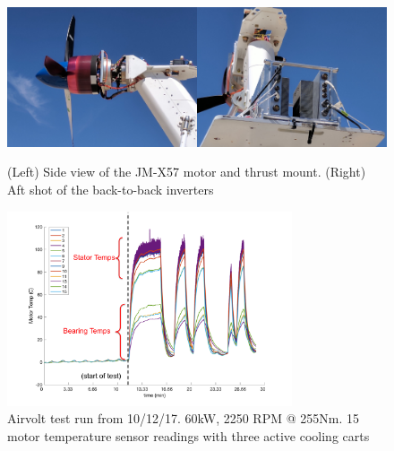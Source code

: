 \documentclass[]{aiaa-tc}%
\begin{document}
\begin{figure}[!htb]%
	\centering
	\includegraphics[width=0.5\textwidth]{figures/AirVoltSide.jpg}\includegraphics[width=0.5\textwidth]{figures/AirVolt_Back.jpg}
	\caption{(Left) Side view of the JM-X57 motor and thrust mount. (Right) Aft shot of the back-to-back inverters}
	\label{fig:airvolt2}
\end{figure}

\begin{figure}[!htb]%
	\centering
	\includegraphics[width=0.75\textwidth]{figures/10_12_cleanedv2.png}
	\caption{Airvolt test run from 10/12/17. 60kW, 2250 RPM @ 255Nm. 15 motor temperature sensor readings with three active cooling carts}
	\label{fig:airvoltData}
\end{figure}
\end{document}
